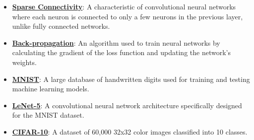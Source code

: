 \documentclass{article}%
\begin{document}
\begin{itemize}[leftmargin=*]
\item \href{https://purdue.brightspace.com/d2l/common/assets/pdfjs-d2l-dist/1.0.14-legacy/web/viewer.html?file=\%2Fcontent\%2Fenforced\%2F1095467-wl.202510.CS.24300.001\%2F09L1-cnn.pdf\%3Fou\%3D1095467\&lang=en-us\&container=d2l-fileviewer-rendered-pdf\&fullscreen=d2l-fileviewer-rendered-pdf-dialog\&height=667#page=10}{\textbf{Sparse Connectivity}}: A characteristic of convolutional neural networks where each neuron is connected to only a few neurons in the previous layer, unlike fully connected networks.%
\item \href{https://purdue.brightspace.com/d2l/common/assets/pdfjs-d2l-dist/1.0.14-legacy/web/viewer.html?file=\%2Fcontent\%2Fenforced\%2F1095467-wl.202510.CS.24300.001\%2F09L1-cnn.pdf\%3Fou\%3D1095467\&lang=en-us\&container=d2l-fileviewer-rendered-pdf\&fullscreen=d2l-fileviewer-rendered-pdf-dialog\&height=667#page=16}{\textbf{Back-propagation}}: An algorithm used to train neural networks by calculating the gradient of the loss function and updating the network's weights.%
\item \href{https://purdue.brightspace.com/d2l/common/assets/pdfjs-d2l-dist/1.0.14-legacy/web/viewer.html?file=\%2Fcontent\%2Fenforced\%2F1095467-wl.202510.CS.24300.001\%2F09L1-cnn.pdf\%3Fou\%3D1095467\&lang=en-us\&container=d2l-fileviewer-rendered-pdf\&fullscreen=d2l-fileviewer-rendered-pdf-dialog\&height=667#page=21}{\textbf{MNIST}}: A large database of handwritten digits used for training and testing machine learning models.%
\item \href{https://purdue.brightspace.com/d2l/common/assets/pdfjs-d2l-dist/1.0.14-legacy/web/viewer.html?file=\%2Fcontent\%2Fenforced\%2F1095467-wl.202510.CS.24300.001\%2F09L1-cnn.pdf\%3Fou\%3D1095467\&lang=en-us\&container=d2l-fileviewer-rendered-pdf\&fullscreen=d2l-fileviewer-rendered-pdf-dialog\&height=667#page=22}{\textbf{LeNet-5}}: A convolutional neural network architecture specifically designed for the MNIST dataset.%
\item \href{https://purdue.brightspace.com/d2l/common/assets/pdfjs-d2l-dist/1.0.14-legacy/web/viewer.html?file=\%2Fcontent\%2Fenforced\%2F1095467-wl.202510.CS.24300.001\%2F09L1-cnn.pdf\%3Fou\%3D1095467\&lang=en-us\&container=d2l-fileviewer-rendered-pdf\&fullscreen=d2l-fileviewer-rendered-pdf-dialog\&height=667#page=23}{\textbf{CIFAR-10}}: A dataset of 60,000 32x32 color images classified into 10 classes.%
\end{itemize}

%
\end{document}
